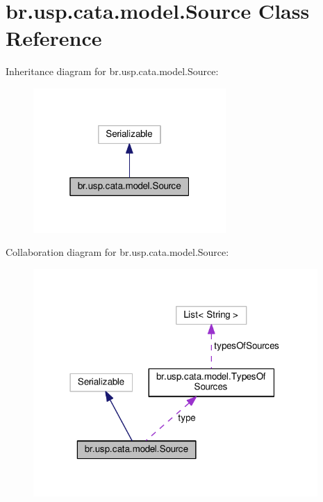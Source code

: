 \hypertarget{classbr_1_1usp_1_1cata_1_1model_1_1_source}{\section{br.\+usp.\+cata.\+model.\+Source Class Reference}
\label{classbr_1_1usp_1_1cata_1_1model_1_1_source}
}


Inheritance diagram for br.\+usp.\+cata.\+model.\+Source\+:\nopagebreak
\begin{figure}[H]
\begin{center}
\leavevmode
\includegraphics[width=208pt]{classbr_1_1usp_1_1cata_1_1model_1_1_source__inherit__graph}
\end{center}
\end{figure}


Collaboration diagram for br.\+usp.\+cata.\+model.\+Source\+:\nopagebreak
\begin{figure}[H]
\begin{center}
\leavevmode
\includegraphics[width=307pt]{classbr_1_1usp_1_1cata_1_1model_1_1_source__coll__graph}
\end{center}
\end{figure}
